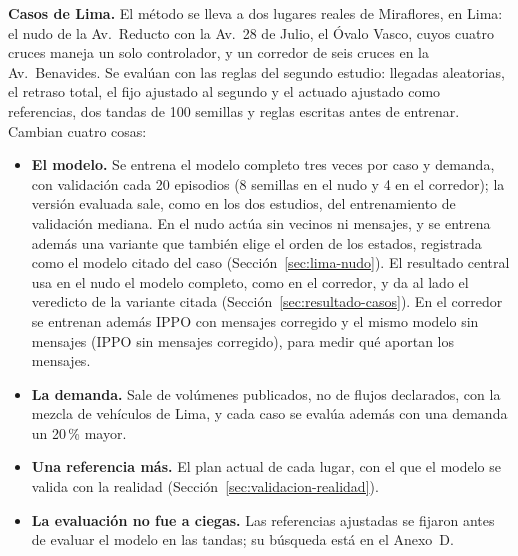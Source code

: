 \noindent\textbf{Casos de Lima.} El método se lleva a dos lugares
reales de Miraflores, en Lima: el nudo de la Av.~Reducto con la
Av.~28 de Julio, el Óvalo Vasco, cuyos cuatro cruces maneja un solo
controlador, y un corredor de seis cruces en la Av.~Benavides. Se
evalúan con las reglas del segundo estudio: llegadas aleatorias, el
retraso total, el fijo ajustado al segundo y el actuado ajustado como
referencias, dos tandas de 100 semillas y reglas escritas antes de
entrenar. Cambian cuatro cosas:
\begin{itemize}
  \item \textbf{El modelo.} Se entrena el modelo completo tres veces
    por caso y demanda, con validación cada 20 episodios (8 semillas en
    el nudo y 4 en el corredor); la versión evaluada sale, como en los
    dos estudios, del entrenamiento de validación mediana. En el nudo actúa sin
    vecinos ni mensajes, y se entrena además una variante que también
    elige el orden de los estados, registrada como el modelo citado del
    caso (Sección~\ref{sec:lima-nudo}). El resultado central usa en el
    nudo el modelo completo, como en el corredor, y da al lado el
    veredicto de la variante citada (Sección~\ref{sec:resultado-casos}).
    En el corredor se entrenan
    además IPPO con mensajes corregido y el mismo modelo sin mensajes
    (IPPO sin mensajes corregido), para medir qué aportan los mensajes.
  \item \textbf{La demanda.} Sale de volúmenes publicados, no de flujos
    declarados, con la mezcla de vehículos de Lima, y cada caso se
    evalúa además con una demanda un 20\,\% mayor.
  \item \textbf{Una referencia más.} El plan actual de cada lugar, con
    el que el modelo se valida con la realidad
    (Sección~\ref{sec:validacion-realidad}).
  \item \textbf{La evaluación no fue a ciegas.} Las referencias
    ajustadas se fijaron antes de evaluar el modelo en las tandas; su
    búsqueda está en el Anexo~D.
\end{itemize}
